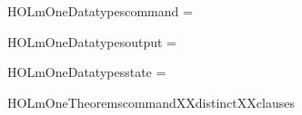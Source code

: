 \newcommand{\HOLmOneDate}{02 March 2020}
\newcommand{\HOLmOneTime}{20:04}
\begin{SaveVerbatim}{HOLmOneDatatypescommand}
 =  \HOLTokenBar{} 
\end{SaveVerbatim}
\newcommand{\HOLmOneDatatypescommand}{\UseVerbatim{HOLmOneDatatypescommand}}
\begin{SaveVerbatim}{HOLmOneDatatypesoutput}
 =  \HOLTokenBar{} 
\end{SaveVerbatim}
\newcommand{\HOLmOneDatatypesoutput}{\UseVerbatim{HOLmOneDatatypesoutput}}
\begin{SaveVerbatim}{HOLmOneDatatypesstate}
 =  \HOLTokenBar{}  \HOLTokenBar{} 
\end{SaveVerbatim}
\newcommand{\HOLmOneDatatypesstate}{\UseVerbatim{HOLmOneDatatypesstate}}
\newcommand{\HOLmOneDatatypes}{
\HOLmOneDatatypescommand\HOLmOneDatatypesoutput\HOLmOneDatatypesstate}
\begin{SaveVerbatim}{HOLmOneTheoremscommandXXdistinctXXclauses}
\HOLTokenTurnstile{}  \HOLSymConst{\HOLTokenNotEqual{}} 
\end{SaveVerbatim}
\newcommand{\HOLmOneTheoremscommandXXdistinctXXclauses}{\UseVerbatim{HOLmOneTheoremscommandXXdistinctXXclauses}}
